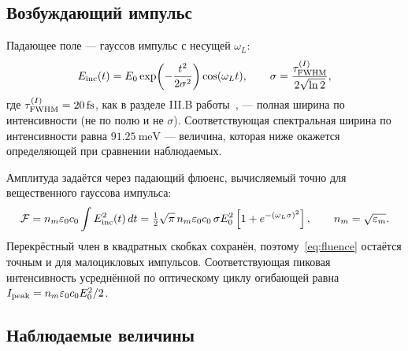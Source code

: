 \subsection{Возбуждающий импульс}
\label{sec:pulse}

Падающее поле — гауссов импульс с несущей $\omega_L$:
\begin{equation}
  E_{\rm inc}(t) = E_0 \exp\!\left(-\frac{t^2}{2\sigma^2}\right)\cos(\omega_L t),
  \qquad
  \sigma = \frac{\tau^{(I)}_{\rm FWHM}}{2\sqrt{\ln 2}},
  \label{eq:pulse}
\end{equation}
где $\tau^{(I)}_{\rm FWHM}=\SI{20}{\femto\second}$, как в разделе III.B
работы~\cite{shah2013}, --- полная ширина по
интенсивности (не по полю и не $\sigma$). Соответствующая спектральная ширина
по интенсивности равна $\SI{91.25}{\milli\electronvolt}$ — величина, которая
ниже окажется определяющей при сравнении наблюдаемых.

Амплитуда задаётся через падающий флюенс, вычисляемый точно для вещественного
гауссова импульса:
\begin{equation}
  \mathcal{F} = n_m\varepsilon_0 c_0 \int E_{\rm inc}^2(t)\,dt
  = \tfrac{1}{2}\sqrt{\pi}\,n_m\varepsilon_0 c_0\,\sigma E_0^2
    \left[1 + e^{-(\omega_L\sigma)^2}\right],
  \qquad n_m=\sqrt{\varepsilon_m}.
  \label{eq:fluence}
\end{equation}
Перекрёстный член в квадратных скобках сохранён, поэтому~\eqref{eq:fluence}
остаётся точным и для малоцикловых импульсов.
Соответствующая пиковая интенсивность усреднённой по оптическому циклу
огибающей равна $I_{\rm peak}=n_m\varepsilon_0c_0E_0^2/2$.

\subsection{Наблюдаемые величины}
\label{sec:observables}

